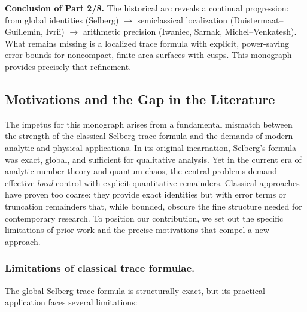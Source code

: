 \medskip

\noindent\textbf{Conclusion of Part 2/8.}
The historical arc reveals a continual progression: from global identities
(Selberg) $\rightarrow$ semiclassical localization (Duistermaat–Guillemin,
Ivrii) $\rightarrow$ arithmetic precision (Iwaniec, Sarnak, Michel–Venkatesh).
What remains missing is a localized trace formula with explicit,
power-saving error bounds for noncompact, finite-area surfaces with cusps. This
monograph provides precisely that refinement.


\subsection*{Motivations and the Gap in the Literature}

The impetus for this monograph arises from a fundamental mismatch between the
strength of the classical Selberg trace formula and the demands of modern
analytic and physical applications. In its original incarnation, Selberg’s
formula was exact, global, and sufficient for qualitative analysis. Yet in the
current era of analytic number theory and quantum chaos, the central problems
demand effective \emph{local} control with explicit quantitative remainders.
Classical approaches have proven too coarse: they provide exact identities but
with error terms or truncation remainders that, while bounded, obscure the fine
structure needed for contemporary research. To position our contribution, we
set out the specific limitations of prior work and the precise motivations that
compel a new approach.

\subsubsection*{Limitations of classical trace formulae.}
The global Selberg trace formula is structurally exact, but its practical
application faces several limitations:

